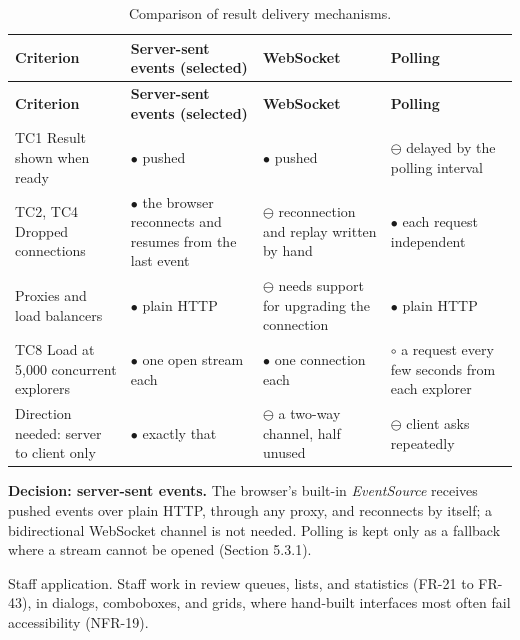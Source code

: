 {\small
\begin{longtable}{|>{\raggedright\arraybackslash}p{}|>{\raggedright\arraybackslash}p{}|>{\raggedright\arraybackslash}p{}|>{\raggedright\arraybackslash}p{}|}
\caption{Comparison of result delivery mechanisms.} \\
\hline
\textbf{Criterion} & \textbf{Server-sent events (selected)} & \textbf{WebSocket\cite{r176}} & \textbf{Polling} \\ \hline
\endfirsthead
\hline
\textbf{Criterion} & \textbf{Server-sent events (selected)} & \textbf{WebSocket\cite{r176}} & \textbf{Polling} \\ \hline
\endhead
TC1 Result shown when ready & $\bullet$ pushed & $\bullet$ pushed & $\ominus$ delayed by the polling interval \\ \hline
TC2, TC4 Dropped connections & $\bullet$ the browser reconnects and resumes from the last event\cite{r144} & $\ominus$ reconnection and replay written by hand & $\bullet$ each request independent \\ \hline
Proxies and load balancers & $\bullet$ plain HTTP & $\ominus$ needs support for upgrading the connection & $\bullet$ plain HTTP \\ \hline
TC8 Load at 5,000 concurrent explorers & $\bullet$ one open stream each & $\bullet$ one connection each & $\circ$ a request every few seconds from each explorer \\ \hline
Direction needed: server to client only & $\bullet$ exactly that & $\ominus$ a two-way channel, half unused & $\ominus$ client asks repeatedly \\ \hline
\end{longtable}
}

\textbf{Decision: server-sent events.} The browser's built-in \textit{EventSource} receives pushed events over plain HTTP, through any proxy, and reconnects by itself\cite{r144}; a bidirectional WebSocket channel is not needed. Polling is kept only as a fallback where a stream cannot be opened (Section 5.3.1).

Staff application. Staff work in review queues, lists, and statistics (FR-21 to FR-43), in dialogs, comboboxes, and grids, where hand-built interfaces most often fail accessibility (NFR-19).

